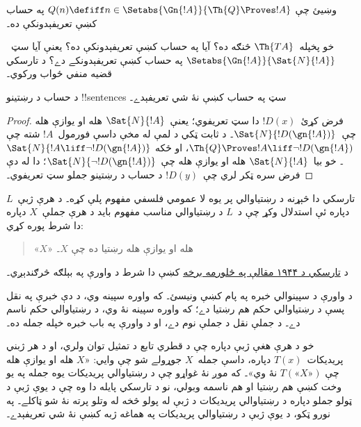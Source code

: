 \documentclass[../../../include/open-logic-section]{subfiles}
\begin{document}
\begin{prob}
وښيئ چې $Q(n) \defiff n \in \Setabs{\Gn{!A}}{\Th{Q} \Proves !A}$
  په حساب کښې تعريفېدونکې ده۔
\end{prob}

خو پخپله~$\Th{TA}$ څنګه ده؟ آيا په حساب کښې تعريفېدونکې ده؟
يعنې آيا سټ~$\Setabs{\Gn{!A}}{\Sat{N}{!A}}$ په حساب کښې
تعريفېدونکے دے؟ د تارسکي قضيه منفي ځواب ورکوي۔

\begin{thm}
د حساب د رښتينو !!{sentence}s سټ په حساب کښې نۀ شي تعريفېدے۔
\end{thm}

\begin{proof}
فرض کړئ~$!D(x)$ دا سټ تعريفوي؛ يعنې~$\Sat{N}{!A}$ هله او
يوازې هله چې~$\Sat{N}{!D(\gn{!A})}$۔ د ثابت ټکي د لمې له مخې
داسې فورمول~$!A$ شته چې
$\Th{Q} \Proves !A \liff \lnot !D(\gn{!A})$، او ځکه
$\Sat{N}{!A \liff \lnot !D(\gn{!A})}$۔ خو بيا~$\Sat{N}{!A}$
هله او يوازې هله چې~$\Sat{N}{\lnot !D(\gn{!A})}$؛ دا له دې
فرض سره ټکر لري چې~$!D(y)$ د حساب د رښتينو جملو سټ تعريفوي۔
\end{proof}

تارسکي دا څېړنه د رښتياوالي پر يوه لا عمومي فلسفي مفهوم پلې کړه۔
د هرې ژبې~$L$ دپاره ئې استدلال وکړ چې د~$L$ د رښتياوالي مناسب
مفهوم بايد د هرې جملې~$X$ دپاره دا شرط پوره کړي:
\begin{quote}
«$X$» هله او يوازې هله رښتيا ده چې $X$۔
\end{quote}
د \href{https://doi.org/10.2307/2102968}{تارسکي د ۱۹۴۴ مقالې په څلورمه برخه} کښې دا شرط د واورې په بېلګه څرګندېږي۔
\begin{explain}
د واورې د سپينوالي خبره په پام کښې ونيسئ۔ که واوره سپينه وي،
د دې خبرې په نقل پسې د رښتياوالي حکم هم رښتيا دے؛ که واوره
سپينه نۀ وي، د رښتياوالي حکم ناسم دے۔ د جملې نقل د جملې نوم
دے، او د واورې په باب خبره خپله جمله ده۔
\end{explain}
خو د هرې هغې ژبې دپاره چې د قطري تابع د تمثيل توان ولري، او د
هر ژبني پريديکات~$T(x)$ دپاره، داسې جمله~$X$ جوړولے شو چې وايي:
«$X$ هله او يوازې هله چې $T(\text{«$X$»})$ نۀ وي»۔ که موږ نۀ
غواړو چې د رښتياوالي پريديکات يوه جمله په يو وخت کښې هم رښتيا او
هم ناسمه وبولي، نو د تارسکي پايله دا وه چې د يوې ژبې د ټولو جملو
دپاره د رښتياوالي پريديکات د ژبې له پولو څخه له وتلو پرته نۀ شو
ټاکلے۔ په نورو ټکو، د يوې ژبې د رښتياوالي پريديکات په هماغه ژبه
کښې نۀ شي تعريفېدے۔
\end{document}
